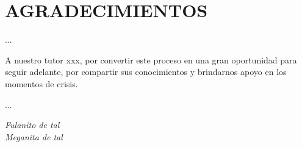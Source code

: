 \chapter*{AGRADECIMIENTOS}

...

A nuestro tutor xxx, por convertir este proceso en una gran oportunidad para seguir adelante, por compartir sus conocimientos y brindarnos apoyo en los momentos de crisis.

...

\begin{flushright}
\textit{Fulanito de tal}\\
\textit{Meganita de tal}
\end{flushright}
